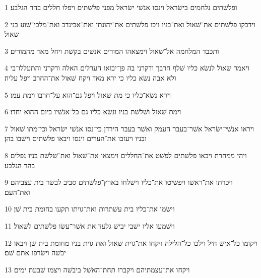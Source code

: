 \par 1 ופלשׁתים נלחמים בישׂראל וינסו אנשׁי ישׂראל מפני פלשׁתים ויפלו חללים בהר הגלבע׃
\par 2 וידבקו פלשׁתים את־שׁאול ואת־בניו ויכו פלשׁתים את־יהונתן ואת־אבינדב ואת־מלכי־שׁוע בני שׁאול׃
\par 3 ותכבד המלחמה אל־שׁאול וימצאהו המורים אנשׁים בקשׁת ויחל מאד מהמורים׃
\par 4 ויאמר שׁאול לנשׂא כליו שׁלף חרבך ודקרני בה פן־יבואו הערלים האלה ודקרני והתעללו־בי ולא אבה נשׂא כליו כי ירא מאד ויקח שׁאול את־החרב ויפל עליה׃
\par 5 וירא נשׂא־כליו כי מת שׁאול ויפל גם־הוא על־חרבו וימת עמו׃
\par 6 וימת שׁאול ושׁלשׁת בניו ונשׂא כליו גם כל־אנשׁיו ביום ההוא יחדו׃
\par 7 ויראו אנשׁי־ישׂראל אשׁר־בעבר העמק ואשׁר בעבר הירדן כי־נסו אנשׁי ישׂראל וכי־מתו שׁאול ובניו ויעזבו את־הערים וינסו ויבאו פלשׁתים וישׁבו בהן׃
\par 8 ויהי ממחרת ויבאו פלשׁתים לפשׁט את־החללים וימצאו את־שׁאול ואת־שׁלשׁת בניו נפלים בהר הגלבע׃
\par 9 ויכרתו את־ראשׁו ויפשׁיטו את־כליו וישׁלחו בארץ־פלשׁתים סביב לבשׂר בית עצביהם ואת־העם׃
\par 10 וישׂמו את־כליו בית עשׁתרות ואת־גויתו תקעו בחומת בית שׁן׃
\par 11 וישׁמעו אליו ישׁבי יבישׁ גלעד את אשׁר־עשׂו פלשׁתים לשׁאול׃
\par 12 ויקומו כל־אישׁ חיל וילכו כל־הלילה ויקחו את־גוית שׁאול ואת גוית בניו מחומת בית שׁן ויבאו יבשׁה וישׂרפו אתם שׁם׃
\par 13 ויקחו את־עצמתיהם ויקברו תחת־האשׁל ביבשׁה ויצמו שׁבעת ימים׃


